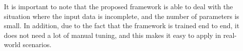 It is important to note that the proposed framework is able to deal with the situation where the input data is incomplete, and the number of parameters is small. In addition, due to the fact that the framework is trained end to end, it does not need a lot of manual tuning, and this makes it easy to apply in real-world scenarios.
